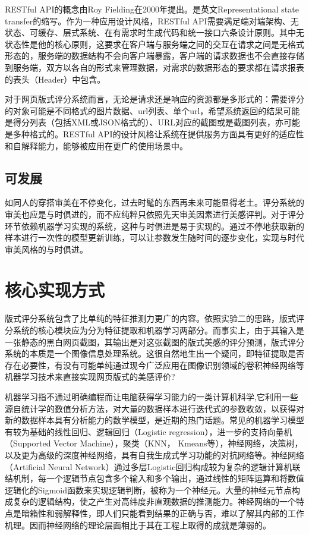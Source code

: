 RESTful API的概念由Roy Fielding在2000年提出\cite{Fielding2000}。是英文Representational state transfer的缩写。作为一种应用设计风格，RESTful API需要满足端对端架构、无状态、可缓存、层式系统、在有需求时生成代码和统一接口六条设计原则\cite{Paliulioniene2013, Richardson2008}。其中无状态性是他的核心原则，这要求在客户端与服务端之间的交互在请求之间是无格式形态的，服务端的数据结构不会向客户端暴露，客户端的请求数据也不会直接存储到服务端，双方以各自的形式来管理数据，对需求的数据形态的要求都在请求报表的表头（Header）中包含。

对于网页版式评分系统而言，无论是请求还是响应的资源都是多形式的：需要评分的对象可能是不同格式的图片数据、url列表、单个url，希望系统返回的结果可能是得分列表（包括XML或JSON格式的）、URL对应的截图或是截图列表，亦可能是多种格式的。RESTful API的设计风格让系统在提供服务方面具有更好的适应性和自解释能力，能够被应用在更广的使用场景中。

\subsection{可发展}
如同人的穿搭审美在不停变化，过去时髦的东西再未来可能显得老土。评分系统的审美也应是与时俱进的，而不应纯粹只依照先天审美因素进行美感评判。对于评分环节依赖机器学习实现的系统，这种与时俱进是易于实现的。通过不停地获取新的样本进行一次性的模型更新训练，可以让参数发生随时间的逐步变化，实现与时代审美风格的与时俱进。

\section{核心实现方式}
\label{sec:app-core}
版式评分系统包含了比单纯的特征推测力更广的内容。依照实验二的思路，版式评分系统的核心模块应为分为特征提取和机器学习两部分。而事实上，由于其输入是一张静态的黑白网页截图，其输出是对这张截图的版式美感的评分预测，版式评分系统的本质是一个图像信息处理系统。这很自然地生出一个疑问，即特征提取是否存在必要性，有没有可能单纯通过现今广泛应用在图像识别领域的卷积神经网络等机器学习技术来直接实现网页版式的美感评价?

机器学习指不通过明确编程而让电脑获得学习能力的一类计算机科学\cite{Koza1996},它利用一些源自统计学的数值分析方法，对大量的数据样本进行迭代式的参数收敛，以获得对新的数据样本具有分析能力的数学模型，是近期的热门话题。常见的机器学习模型有较为基础的线性回归、逻辑回归（Logistic regression），进一步的支持向量机（Supported Vector Machine），聚类（KNN， Kmeans等），神经网络，决策树，以及更为高级的深度神经网络，具有自我生成式学习功能的对抗网络等。神经网络（Artificial Neural Network）通过多层Logistic回归构成较为复杂的逻辑计算机联结机制，每一个逻辑节点包含多个输入和多个输出，通过线性的矩阵运算和将数值逻辑化的Sigmoid函数来实现逻辑判断，被称为一个神经元。大量的神经元节点构成复杂的逻辑结构，使之产生对高纬度非直观数据的推测能力。神经网络的一个特点是暗箱性和弱解释性，即人们只能看到结果的正确与否，难以了解其内部的工作机理。因而神经网络的理论层面相比于其在工程上取得的成就是薄弱的。

